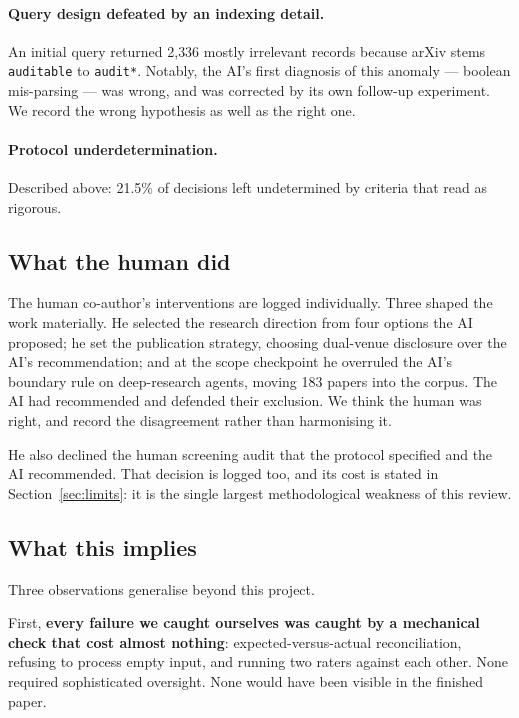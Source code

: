 \paragraph{Query design defeated by an indexing detail.} An initial query returned 2{,}336
mostly irrelevant records because arXiv stems \texttt{auditable} to \texttt{audit*}. Notably,
the AI's first diagnosis of this anomaly --- boolean mis-parsing --- was wrong, and was
corrected by its own follow-up experiment. We record the wrong hypothesis as well as the right
one.

\paragraph{Protocol underdetermination.} Described above: 21.5\% of decisions left
undetermined by criteria that read as rigorous.

\subsection{What the human did}

The human co-author's interventions are logged individually. Three shaped the work materially.
He selected the research direction from four options the AI proposed; he set the publication
strategy, choosing dual-venue disclosure over the AI's recommendation; and at the scope
checkpoint he overruled the AI's boundary rule on deep-research agents, moving 183 papers into
the corpus. The AI had recommended and defended their exclusion. We think the human was right,
and record the disagreement rather than harmonising it.

He also declined the human screening audit that the protocol specified and the AI recommended.
That decision is logged too, and its cost is stated in Section~\ref{sec:limits}: it is the
single largest methodological weakness of this review.

\subsection{What this implies}

Three observations generalise beyond this project.

First, \textbf{every failure we caught ourselves was caught by a mechanical check that cost
almost nothing}: expected-versus-actual reconciliation, refusing to process empty input, and
running two raters against each other. None required sophisticated oversight. None would have been
visible in the finished paper.

